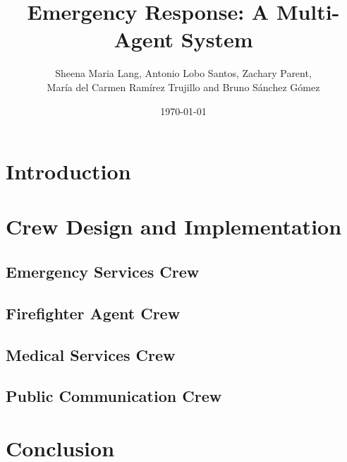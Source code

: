 \documentclass[a4paper,twocolumn]{article}
\title{Emergency Response: A Multi-Agent System}
\author{Sheena Maria Lang, Antonio Lobo Santos, Zachary Parent, \\ María del Carmen Ramírez Trujillo and Bruno Sánchez Gómez}
\date{\today}
\begin{document}
\maketitle
\tableofcontents
\newpage

\section{Introduction}


\section{Crew Design and Implementation}

\subsection{Emergency Services Crew}



\subsection{Firefighter Agent Crew}



\subsection{Medical Services Crew}



\subsection{Public Communication Crew}






\section{Conclusion}
\end{document}
